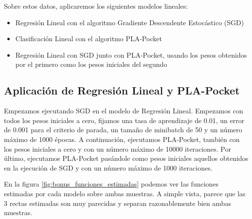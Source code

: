 \documentclass[10pt,a4paper]{article}
\begin{document}
Sobre estos datos, aplicaremos los siguientes modelos lineales:

\begin{itemize}
	\item Regresión Lineal con el algoritmo Gradiente Descendente Estocástico (SGD)
	\item Clasificación Lineal con el algoritmo PLA-Pocket
	\item Regresión Lineal con SGD junto con PLA-Pocket, usando los pesos obtenidos por el primero como los pesos iniciales del segundo
\end{itemize}



\subsection{Aplicación de Regresión Lineal y PLA-Pocket}

Empezamos ejecutando SGD en el modelo de Regresión Lineal. Empezamos con todos los pesos iniciales a cero, fijamos una tasa de aprendizaje de 0.01, un error de 0.001 para el criterio de parada, un tamaño de minibatch de 50 y un número máximo de 1000 épocas. A continuación, ejecutamos PLA-Pocket, también con los pesos iniciales a cero y con un número máximo de 10000 iteraciones. Por último, ejecutamos PLA-Pocket pasándole como pesos iniciales aquellos obtenidos en la ejecución de SGD y con un número máximo de 1000 iteraciones.

En la figura \ref{fig:bonus_funciones_estimadas} podemos ver las funciones estimadas por cada modelo sobre ambas muestras. A simple vista, parece que las 3 rectas estimadas son muy parecidas y separan razonablemente bien ambas muestras.
\end{document}
